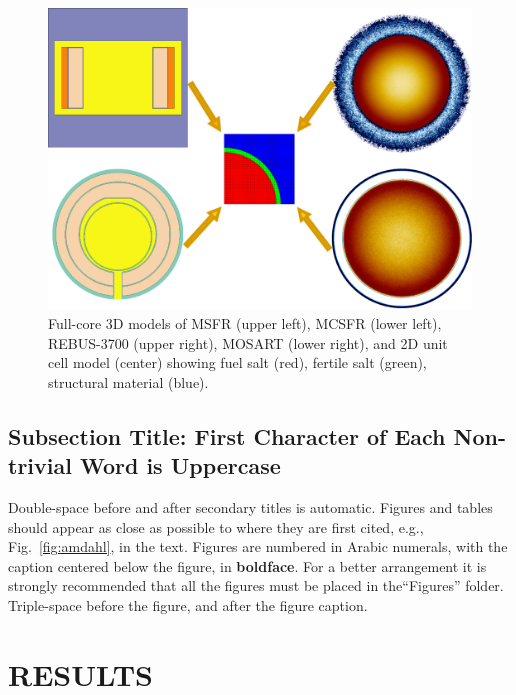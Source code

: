 \documentclass[letterpaper]{mandc2019}
\begin{document}
\begin{figure}[!htb]
  \centering
  \includegraphics[scale=0.35]{./Figures/fsmsrs.pdf}
  \caption{Full-core 3D models of \gls{MSFR} (upper left), \gls{MCSFR} (lower left), REBUS-3700 (upper right), \gls{MOSART} (lower right), and 2D unit cell model (center) showing fuel salt (red), fertile salt (green), structural material (blue).}   
  \label{fig:unit_cell}
\end{figure}

\subsection{Subsection Title: First Character of Each Non-trivial Word is Uppercase} 
\label{sec:second}

Double-space before and after secondary titles is automatic.  Figures and 
tables should appear as close as possible to where they are first
cited, e.g., Fig.~\ref{fig:amdahl}, in the text.  Figures are numbered in Arabic 
numerals, with the caption centered below the figure, in \textbf{boldface}. For a better 
arrangement it is strongly recommended that all the figures must be placed in the``Figures'' 
folder. Triple-space before the figure, and after the figure caption.

\section{RESULTS} 
\end{document}

